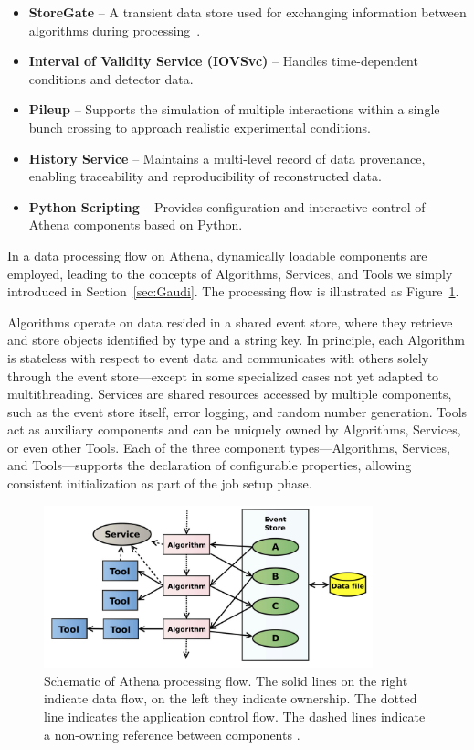 \begin{itemize}
    \item \textbf{StoreGate} – A transient data store used for exchanging information between algorithms during processing~\cite{AthenaStoreGate}.
    \item \textbf{Interval of Validity Service (IOVSvc)} – Handles time-dependent conditions and detector data.
    \item \textbf{Pileup} – Supports the simulation of multiple interactions within a single bunch crossing to approach realistic experimental conditions.
    \item \textbf{History Service} – Maintains a multi-level record of data provenance, enabling traceability and reproducibility of reconstructed data.
    \item \textbf{Python Scripting} – Provides configuration and interactive control of Athena components based on Python.
\end{itemize}

In a data processing flow on Athena, dynamically loadable components are employed, leading to the concepts of Algorithms, Services, and Tools we simply introduced in Section~\ref{sec:Gaudi}. The processing flow is illustrated as Figure~\ref{fig:Athena_process}. 

Algorithms operate on data resided in a shared event store, where they retrieve and store objects identified by type and a string key. In principle, each Algorithm is stateless with respect to event data and communicates with others solely through the event store—except in some specialized cases not yet adapted to multithreading. Services are shared resources accessed by multiple components, such as the event store itself, error logging, and random number generation. Tools act as auxiliary components and can be uniquely owned by Algorithms, Services, or even other Tools. Each of the three component types—Algorithms, Services, and Tools—supports the declaration of configurable properties, allowing consistent initialization as part of the job setup phase.

\begin{figure}[htbp]
  \centering
  \includegraphics[width=0.85\textwidth]{figs/chapter3/Athena_process.png}
  \caption{Schematic of Athena processing flow. The solid lines on the right indicate data flow, on the left they indicate ownership. The dotted line indicates the application control flow. The dashed lines indicate a non-owning reference between components \cite{ATLAScomputing2025}.}
  \label{fig:Athena_process}
\end{figure}


